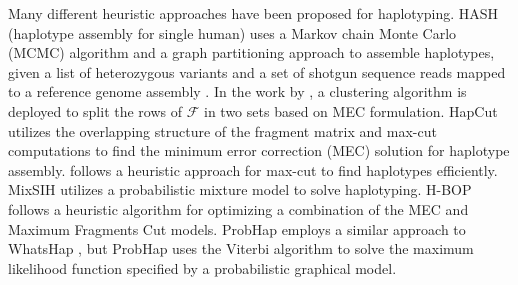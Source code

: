 Many different heuristic approaches have been proposed for haplotyping.
HASH (haplotype assembly for single human) uses a Markov chain Monte Carlo (MCMC) algorithm and a graph partitioning approach to assemble haplotypes,
given a list of heterozygous variants and a set of shotgun sequence reads mapped to a reference genome assembly \citep{bansal2008mcmc}. 
In the work by \cite{wang2007clustering}, a clustering algorithm is deployed to split the rows of $\mathcal{F}$ in two sets based on MEC formulation.
HapCut \citep{Bansal2008} utilizes the overlapping structure of the fragment matrix and max-cut computations to find the minimum error correction (MEC) solution for haplotype assembly. 
\cite{Duitama2010} follows a heuristic approach for max-cut to find haplotypes efficiently. 
MixSIH \citep{matsumoto2013mixsih} utilizes a probabilistic mixture model to solve haplotyping.
H-BOP \citep{xie2012fast} follows a heuristic algorithm for optimizing a combination of the MEC and Maximum Fragments Cut models.
ProbHap \citep{Kuleshov2014b} employs a similar approach to WhatsHap \citep{Patterson2015}, but ProbHap uses the Viterbi algorithm to solve the maximum likelihood function specified by a probabilistic graphical model. 
